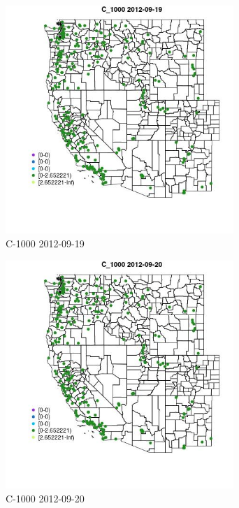 \begin{figure} 
\centering  
\includegraphics[width=0.77\textwidth]{Code_Outputs/ML_input_report_ML_input_PM25_Step5_part_d_de_duplicated_aves_ML_input_MapObsC_10002012-09-19.jpg} 
\caption{\label{fig:ML_input_report_ML_input_PM25_Step5_part_d_de_duplicated_aves_ML_inputMapObsC_10002012-09-19}C-1000 2012-09-19} 
\end{figure} 
 

\begin{figure} 
\centering  
\includegraphics[width=0.77\textwidth]{Code_Outputs/ML_input_report_ML_input_PM25_Step5_part_d_de_duplicated_aves_ML_input_MapObsC_10002012-09-20.jpg} 
\caption{\label{fig:ML_input_report_ML_input_PM25_Step5_part_d_de_duplicated_aves_ML_inputMapObsC_10002012-09-20}C-1000 2012-09-20} 
\end{figure} 
 

